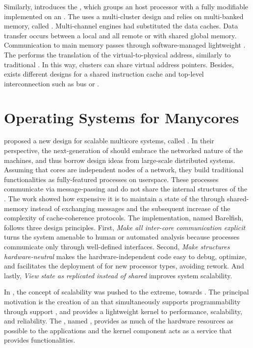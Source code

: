 	Similarly,  introduces the \hero, which
	groups an \arm host processor with a fully modifiable
	\riscv \manycore implemented on an \fpga. The \pmca uses a
	multi-cluster design and relies on multi-banked memory, called \spm.
	Multi-channel \dma engines had substituted the data caches.
	Data transfer occurs between a local \spm and all remote \spms or
	with shared global memory. Communication to main memory passes
	through software-managed lightweight \rab. The \rab performs the
	translation of the virtual-to-physical address, similarly to
	traditional \mmu.
	In this way, clusters can share virtual address pointers.
	Besides, exists different designs for a shared instruction
	cache and top-level interconnection such as bus or \noc{}.

\section{Operating Systems for Manycores}
\label{sec.works.os}

	 proposed a new \os design for scalable multicore
	systems, called \multikernel.
	In their perspective, the next-generation of \oss should embrace the networked nature
	of the machines, and thus borrow design ideas from large-scale distributed
	systems.
	Assuming that cores are independent nodes of a network, they build traditional
	\os functionalities as fully-featured processes on userspace.
	These processes communicate via message-passing and do not share the internal
	structures of the \os.
	The work showed how expensive it is to maintain a state of the \os through
	shared-memory instead of exchanging messages and the subsequent increase of
	the complexity of cache-coherence protocols.
	The \multikernel implementation, named Barelfish, follows three design principles.
	First, \textit{Make all inter-core communication explicit} turns the system
	amenable to human or automated analysis because processes communicate only
	through well-defined interfaces.
	Second, \textit{Make \os structures hardware-neutral} makes the hardware-independent
	code easy to debug, optimize, and facilitates the deployment of \os for new
	processor types, avoiding rework.
	And lastly, \textit{View \os state as replicated instead of shared} improves system
	scalability.

	In , the concept of scalability was pushed
	to the extreme, towards \hpc.
	The principal motivation is the creation of an \os that simultaneously supports
	programmability through support \linux \api, and provides a lightweight kernel
	to performance, scalability, and reliability.
	The \os, named \mos, provides as much of the hardware resources as
	possible to the \hpc applications and the \linux kernel component
	acts as a service that provides \linux functionalities.


